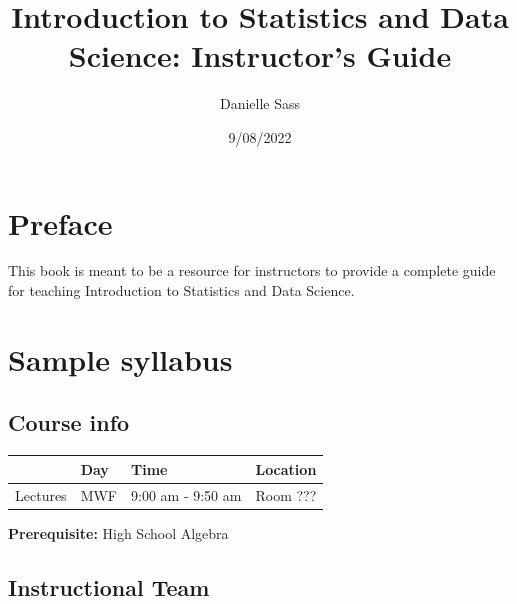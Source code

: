 \documentclass[
  letterpaper,
  DIV=11,
  numbers=noendperiod]{scrreprt}
\title{Introduction to Statistics and Data Science: Instructor's Guide}
\author{Danielle Sass}
\date{9/08/2022}
\renewcommand*\contentsname{Table of contents}
\newcommand\contentsname{Table of contents}
\begin{document}
\maketitle
\ifdefined\Shaded\renewenvironment{Shaded}{\begin{tcolorbox}[interior hidden, frame hidden, borderline west={3pt}{0pt}{shadecolor}, breakable, enhanced, sharp corners, boxrule=0pt]}{\end{tcolorbox}}\fi

\renewcommand*\contentsname{Table of contents}
{
\hypersetup{linkcolor=}
\setcounter{tocdepth}{1}
\tableofcontents
}

\hypertarget{preface}{%
\chapter*{Preface}\label{preface}}

This book is meant to be a resource for instructors to provide a
complete guide for teaching Introduction to Statistics and Data Science.


\hypertarget{sample-syllabus}{%
\chapter*{Sample syllabus}\label{sample-syllabus}}

\hypertarget{course-info}{%
\section*{Course info}\label{course-info}}

\begin{longtable}[]{@{}llll@{}}
\toprule()
& Day & Time & Location \\
\midrule()
\endhead
Lectures & MWF & 9:00 am - 9:50 am & Room ??? \\
\bottomrule()
\end{longtable}

\textbf{Prerequisite:} High School Algebra

\hypertarget{instructional-team}{%
\section*{Instructional Team}\label{instructional-team}}
\end{document}
